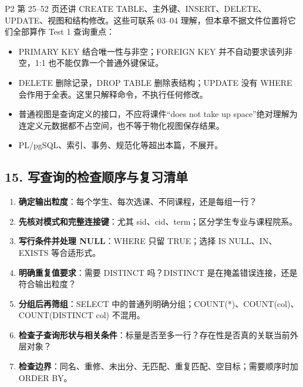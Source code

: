 P2 第 25--52 页还讲 CREATE TABLE、主外键、INSERT、DELETE、UPDATE、视图和结构修改。这些可联系 03--04 理解，但本章不据文件位置将它们全部算作 Test 1 查询重点：

\begin{itemize}
\tightlist
\item
  PRIMARY KEY 结合唯一性与非空；FOREIGN KEY 并不自动要求该列非空，1:1 也不能仅靠一个普通外键保证。
\item
  DELETE 删除记录，DROP TABLE 删除表结构；UPDATE 没有 WHERE 会作用于全表。这里只解释命令，不执行任何修改。
\item
  普通视图是查询定义的接口，不应将课件``does not take up space''绝对理解为连定义元数据都不占空间，也不等于物化视图保存结果。
\item
  PL/pgSQL、索引、事务、规范化等超出本篇，不展开。
\end{itemize}

\subsection{15. 写查询的检查顺序与复习清单}\label{06_sql_queries_zh-ux5199ux67e5ux8be2ux7684ux68c0ux67e5ux987aux5e8fux4e0eux590dux4e60ux6e05ux5355}

\begin{enumerate}
\def\labelenumi{\arabic{enumi}.}
\tightlist
\item
  \textbf{确定输出粒度}：每个学生、每次选课、不同课程，还是每组一行？
\item
  \textbf{先核对模式和完整连接键}：尤其 sid、cid、term；区分学生专业与课程院系。
\item
  \textbf{写行条件并处理 NULL}：WHERE 只留 TRUE；选择 IS NULL、IN、EXISTS 等合适形式。
\item
  \textbf{明确重复值要求}：需要 DISTINCT 吗？DISTINCT 是在掩盖错误连接，还是符合输出粒度？
\item
  \textbf{分组后再筛组}：SELECT 中的普通列明确分组；COUNT(*)、COUNT(col)、COUNT(DISTINCT col) 不混用。
\item
  \textbf{检查子查询形状与相关条件}：标量是否至多一行？存在性是否真的关联当前外层对象？
\item
  \textbf{检查边界}：同名、重修、未出分、无匹配、重复匹配、空目标；需要顺序时加 ORDER BY。
\end{enumerate}

